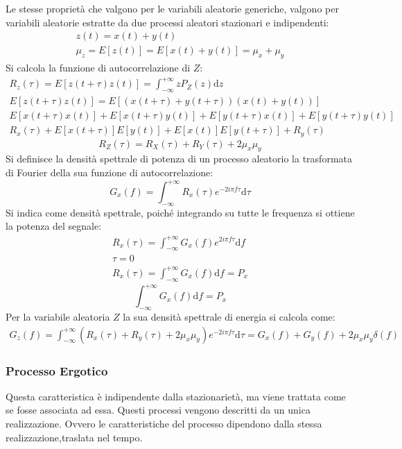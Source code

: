\documentclass{article}
\newcommand{\df}{\mathrm{d}}
\newcommand{\intinf}{\displaystyle\int_{-\infty}^{+\infty}}
\numberwithin{equation}{subsection}
\begin{document}
Le stesse proprietà che valgono per le variabili aleatorie generiche, valgono per variabili aleatorie estratte da due processi aleatori stazionari e indipendenti:
\begin{gather*}
    z(t)=x(t)+y(t)\\
    \mu_z=E[z(t)]=E[x(t)+y(t)]=\mu_x+\mu_y
\end{gather*}
Si calcola la funzione di autocorrelazione di $Z$:
\begin{gather*}
    R_z(\tau)=E[z(t+\tau)z(t)]=\displaystyle\int_{-\infty}^{+\infty}zP_Z(z)\df z\\
    E[z(t+\tau)z(t)]=E[(x(t+\tau)+y(t+\tau))(x(t)+y(t))]\\
    E[x(t+\tau)x(t)]+E[x(t+\tau)y(t)]+E[y(t+\tau)x(t)]+E[y(t+\tau)y(t)]\\
    R_x(\tau)+E[x(t+\tau)]E[y(t)]+E[x(t)]E[y(t+\tau)]+R_y(\tau)
\end{gather*}
\begin{equation}
    R_Z(\tau)=R_X(\tau)+R_Y(\tau)+2\mu_x\mu_y
\end{equation}
Si definisce la densità spettrale di potenza di un processo aleatorio la trasformata di Fourier della sua funzione di autocorrelazione:
\begin{equation}
    G_x(f)=\intinf R_x(\tau)e^{-2i\pi f\tau}\df\tau
\end{equation}
Si indica come densità spettrale, poiché integrando su tutte le frequenza si ottiene la potenza del segnale:
\begin{gather*}
    R_x(\tau)=\intinf G_x(f)e^{2i\pi f\tau}\df f\\
    \tau=0\\
    R_x(\tau)=\intinf G_x(f)\df f=P_x
\end{gather*}
\begin{equation}
    \intinf G_x(f)\df f=P_x
\end{equation}
Per la variabile aleatoria $Z$ la sua densità spettrale di energia si calcola come:
\begin{gather}
    G_z(f)=\int_{-\infty}^{+\infty}\left(R_x(\tau)+R_y(\tau)+2\mu_x\mu_y\right)e^{-2i\pi f\tau}\df \tau=G_x(f)+G_y(f)+2\mu_x\mu_y\delta(f)
\end{gather}

\subsubsection{Processo Ergotico}

Questa caratteristica è indipendente dalla stazionarietà, ma viene trattata come se fosse associata ad essa. 
Questi processi vengono descritti da un unica realizzazione. Ovvero le caratteristiche del processo dipendono dalla stessa realizzazione,traslata nel tempo. 
\end{document}
